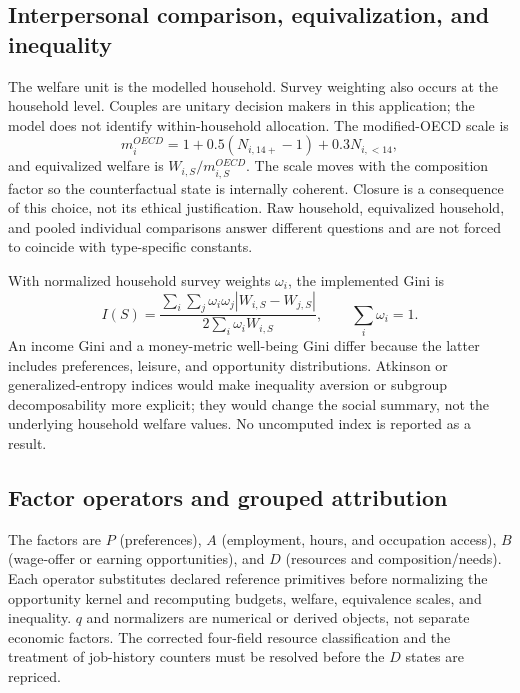 \documentclass[11pt,a4paper]{article}
\begin{document}
\subsection{Interpersonal comparison, equivalization, and inequality}

The welfare unit is the modelled household. Survey weighting also occurs at the
household level. Couples are unitary decision makers in this application; the
model does not identify within-household allocation. The modified-OECD scale is
\begin{equation}
m_i^{OECD}=1+0.5(N_{i,14+}-1)+0.3N_{i,<14},
\end{equation}
and equivalized welfare is $W_{i,S}/m_{i,S}^{OECD}$. The scale moves with the
composition factor so the counterfactual state is internally coherent. Closure
is a consequence of this choice, not its ethical justification. Raw household,
equivalized household, and pooled individual comparisons answer different
questions and are not forced to coincide with type-specific constants.

With normalized household survey weights $\omega_i$, the implemented Gini is
\begin{equation}
I(S)=\frac{\sum_i\sum_j\omega_i\omega_j
|W_{i,S}-W_{j,S}|}{2\sum_i\omega_iW_{i,S}},
\qquad \sum_i\omega_i=1.
\label{eq:gini}
\end{equation}
An income Gini and a money-metric well-being Gini differ because the latter
includes preferences, leisure, and opportunity distributions. Atkinson or
generalized-entropy indices would make inequality aversion or subgroup
decomposability more explicit; they would change the social summary, not the
underlying household welfare values. No uncomputed index is reported as a result.

\subsection{Factor operators and grouped attribution}

The factors are $P$ (preferences), $A$ (employment, hours, and occupation
access), $B$ (wage-offer or earning opportunities), and $D$ (resources and
composition/needs). Each operator substitutes declared reference primitives
before normalizing the opportunity kernel and recomputing budgets, welfare,
equivalence scales, and inequality. $q$ and normalizers are numerical or derived
objects, not separate economic factors. The corrected four-field resource
classification and the treatment of job-history counters must be resolved before
the $D$ states are repriced.
\end{document}
